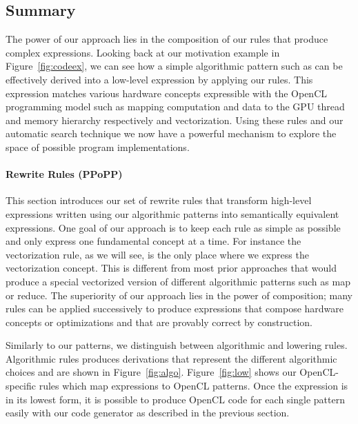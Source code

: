 \subsection{Summary}

The power of our approach lies in the composition of our rules that produce complex expressions.
Looking back at our motivation example in Figure~\ref{fig:codeex}, we can see how a simple algorithmic pattern such as  can be effectively derived into a low-level expression by applying our rules.
This expression matches various hardware concepts expressible with the OpenCL programming model such as mapping computation and data to the GPU thread and memory hierarchy respectively and vectorization.
Using these rules and our automatic search technique we now have a powerful mechanism to explore the space of possible program implementations.

\paragraph{Rewrite Rules (PPoPP)}
This section introduces our set of rewrite rules that transform high-level expressions written using our algorithmic patterns into semantically equivalent expressions.
One goal of our approach is to keep each rule as simple as possible and only express one fundamental concept at a time.
For instance the vectorization rule, as we will see, is the only place where we express the vectorization concept.
This is different from most prior approaches that would produce a special vectorized version of different algorithmic patterns such as map or reduce.
The superiority of our approach lies in the power of composition;
many rules can be applied successively to produce expressions that compose hardware concepts or optimizations and that are provably correct by construction.

Similarly to our patterns, we distinguish between algorithmic and lowering rules.
Algorithmic rules produces derivations that represent the different algorithmic choices and are shown in Figure~\ref{fig:algo}.
Figure~\ref{fig:low} shows our OpenCL-specific rules which map expressions to OpenCL patterns.
Once the expression is in its lowest form, it is possible to produce OpenCL code for each single pattern easily with our code generator as described in the previous section.



